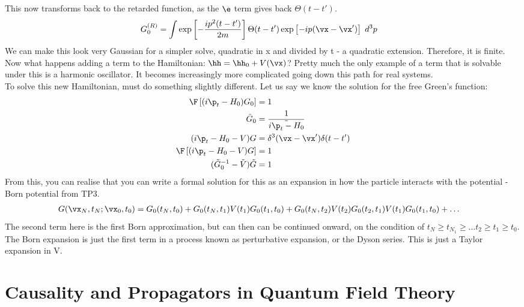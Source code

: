 \documentclass[a4paper, 11pt, normalem]{report}
\begin{document}
This now transforms back to the retarded function, as the $\e$ term gives back $\Theta(t-t')$.
\begin{align}
    G^{(R)}_0 &= \int \exp\left[-\frac{ip^2(t-t')}{2m}\right] \Theta(t-t')\exp\left[-ip(\vx-\vx')\right]\; d^3p
\end{align}
We can make this look very Gaussian for a simpler solve, quadratic in x and divided by t - a quadratic extension.
Therefore, it is finite. \\
Now what happens adding a term to the Hamiltonian: $\hh = \hh_0 + V(\vx)$?
Pretty much the only example of a term that is solvable under this is a harmonic oscillator.
It becomes increasingly more complicated going down this path for real systems.\\
To solve this new Hamiltonian, must do something slightly different.
Let us say we know the solution for the free Green's function:
\begin{align}
    \F\left[(i\p_t - H_0)G_0\right] &= 1 \\
    \tilde{G}_0 &= \frac{1}{\tilde{i\p_t - H_0}} \\
    (i\p_t - H_0 - V)G &= \delta^3(\vx-\vx')\delta(t-t') \\
    \F\left[(i\p_t-H_0-V)G\right] &= 1 \\
    (\tilde{G}_0^{-1} - \tilde{V})\tilde{G} &= 1
\end{align}
From this, you can realise that you can write a formal solution for this as an expansion in how the particle interacts with the potential - Born potential from TP3.
\begin{align}
    G(\vx_N,t_N;\vx_0,t_0) &= G_0(t_N,t_0) + G_0(t_N,t_1)V(t_1)G_0(t_1,t_0) + G_0(t_N,t_2)V(t_2)G_0(t_2,t_1)V(t_1)G_0(t_1,t_0) + \dots
\end{align}
The second term here is the first Born approximation, but can then can be continued onward, on the condition of $t_N \geq t_{N_1} \geq \dots t_2\geq t_1\geq t_0$.
The Born expansion is just the first term in a process known as perturbative expansion, or the Dyson series.
This is just a Taylor expansion in V.

\chapter{Causality and Propagators in Quantum Field Theory}
\end{document}
